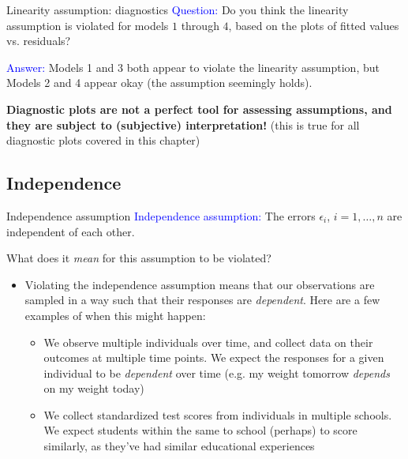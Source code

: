 \documentclass[10pt,t]{beamer}
\begin{document}
\begin{frame}{Linearity assumption: diagnostics}
\textcolor{blue}{Question:} Do you think the linearity assumption is violated for models $1$ through $4$, based on the plots of fitted values vs. residuals?

\vspace{0.3cm}

\textcolor{blue}{Answer:} Models 1 and 3 both appear to violate the linearity assumption, but Models 2 and 4 appear okay (the assumption seemingly holds). 

\vspace{0.3cm}

\textbf{Diagnostic plots are not a perfect tool for assessing assumptions, and they are subject to (subjective) interpretation!} (this is true for all diagnostic plots covered in this chapter)
\end{frame}


\subsection{Independence}

\begin{frame}{Independence assumption}
\textcolor{blue}{Independence assumption:} The errors $\epsilon_i$, $i = 1, \dots, n$ are independent of each other.

\vspace{0.3cm}

What does it \textit{mean} for this assumption to be violated?

\vspace{0.3cm}

\begin{itemize}
	\item[] Violating the independence assumption means that our observations are sampled in a way such that their responses are \textit{dependent}. Here are a few examples of when this might happen:
	\begin{itemize}
		\item We observe multiple individuals over time, and collect data on their outcomes at multiple time points. We expect the responses for a given individual to be \textit{dependent} over time (e.g. my weight tomorrow \textit{depends} on my weight today)
		\item We collect standardized test scores from individuals in multiple schools. We expect students within the same to school (perhaps) to score similarly, as they've had similar educational experiences
	\end{itemize}
\end{itemize}
\end{frame}
\end{document}
